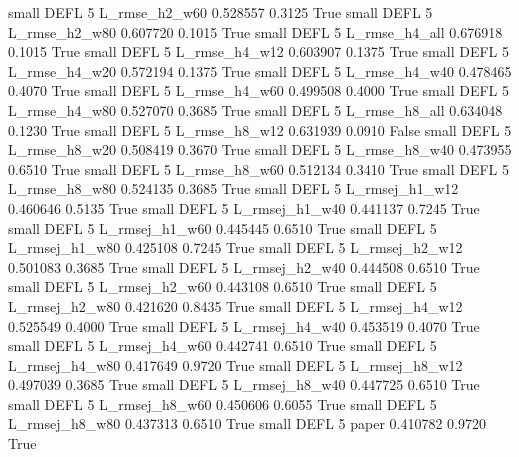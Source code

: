      small     DEFL                 5  L_rmse_h2_w60   0.528557      0.3125    True
     small     DEFL                 5  L_rmse_h2_w80   0.607720      0.1015    True
     small     DEFL                 5  L_rmse_h4_all   0.676918      0.1015    True
     small     DEFL                 5  L_rmse_h4_w12   0.603907      0.1375    True
     small     DEFL                 5  L_rmse_h4_w20   0.572194      0.1375    True
     small     DEFL                 5  L_rmse_h4_w40   0.478465      0.4070    True
     small     DEFL                 5  L_rmse_h4_w60   0.499508      0.4000    True
     small     DEFL                 5  L_rmse_h4_w80   0.527070      0.3685    True
     small     DEFL                 5  L_rmse_h8_all   0.634048      0.1230    True
     small     DEFL                 5  L_rmse_h8_w12   0.631939      0.0910   False
     small     DEFL                 5  L_rmse_h8_w20   0.508419      0.3670    True
     small     DEFL                 5  L_rmse_h8_w40   0.473955      0.6510    True
     small     DEFL                 5  L_rmse_h8_w60   0.512134      0.3410    True
     small     DEFL                 5  L_rmse_h8_w80   0.524135      0.3685    True
     small     DEFL                 5 L_rmsej_h1_w12   0.460646      0.5135    True
     small     DEFL                 5 L_rmsej_h1_w40   0.441137      0.7245    True
     small     DEFL                 5 L_rmsej_h1_w60   0.445445      0.6510    True
     small     DEFL                 5 L_rmsej_h1_w80   0.425108      0.7245    True
     small     DEFL                 5 L_rmsej_h2_w12   0.501083      0.3685    True
     small     DEFL                 5 L_rmsej_h2_w40   0.444508      0.6510    True
     small     DEFL                 5 L_rmsej_h2_w60   0.443108      0.6510    True
     small     DEFL                 5 L_rmsej_h2_w80   0.421620      0.8435    True
     small     DEFL                 5 L_rmsej_h4_w12   0.525549      0.4000    True
     small     DEFL                 5 L_rmsej_h4_w40   0.453519      0.4070    True
     small     DEFL                 5 L_rmsej_h4_w60   0.442741      0.6510    True
     small     DEFL                 5 L_rmsej_h4_w80   0.417649      0.9720    True
     small     DEFL                 5 L_rmsej_h8_w12   0.497039      0.3685    True
     small     DEFL                 5 L_rmsej_h8_w40   0.447725      0.6510    True
     small     DEFL                 5 L_rmsej_h8_w60   0.450606      0.6055    True
     small     DEFL                 5 L_rmsej_h8_w80   0.437313      0.6510    True
     small     DEFL                 5          paper   0.410782      0.9720    True
